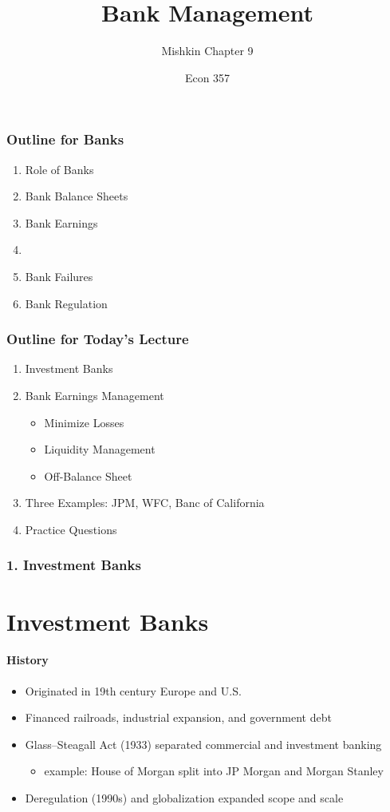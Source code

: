 \documentclass{beamer}
\title{Bank Management}
\subtitle{Mishkin Chapter 9}
\author{Econ 357}
\date{\week}
\begin{document}
\frame{\titlepage}

\begin{frame}
    \frametitle{Outline for Banks}
        \begin{enumerate}
            \item Role of Banks
            \item Bank Balance Sheets
            \item Bank Earnings
            \item {}
            \item Bank Failures
            \item Bank Regulation
        \end{enumerate}
\end{frame}


\begin{frame}
    \frametitle{Outline for Today's Lecture}
    
    \begin{enumerate}
        \item Investment Banks 
        \item Bank Earnings Management
        \begin{itemize}
            \item Minimize Losses
            \item Liquidity Management
            \item Off-Balance Sheet
        \end{itemize}
        \item Three Examples: JPM, WFC, Banc of California
        \item Practice Questions
    \end{enumerate}

\end{frame}

\begin{frame}[t]
\frametitle{1. Investment Banks}
\section{Investment Banks}
\framesubtitle{History}

    \begin{itemize}
        \item Originated in 19th century Europe and U.S. 
        \item Financed railroads, industrial expansion, and government debt
        \item Glass–Steagall Act (1933) separated commercial and investment banking 
        \begin{itemize}
            \item example: House of Morgan split into JP Morgan and Morgan Stanley
        \end{itemize}
        \item Deregulation (1990s) and globalization expanded scope and scale
    \end{itemize}
\end{frame}
\end{document}
